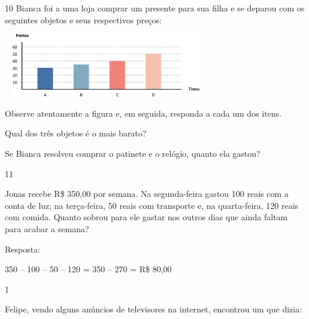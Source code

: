 \begin{escolha}
{

\num{10} Bianca foi a uma loja comprar um presente para sua filha e se deparou
com os seguintes objetos e seus respectivos preços:


\includegraphics[width=3.51697in,height=1.08343in]{media/image80.png}

Observe atentamente a figura e, em seguida, responda a cada um dos itens.

\begin{escolha}

\item
  Qual dos três objetos é o mais barato?

\item
  Se Bianca resolveu comprar o patinete e o relógio, quanto ela gastou?

\num{11}

Jonas recebe R\$ 350,00 por semana. Na segunda-feira gastou 100 reais
com a conta de luz; na terça-feira, 50 reais com transporte e, na quarta-feira, 120 reais com comida. Quanto sobrou para ele gastar nos outros
dias que ainda faltam para acabar a semana?


Resposta:

350 -- 100 -- 50 -- 120 = 350 -- 270 = R\$ 80,00


\num{1}

Felipe, vendo alguns anúncios de televisores na internet, encontrou um que dizia:



\end{escolha}}
\end{escolha}
